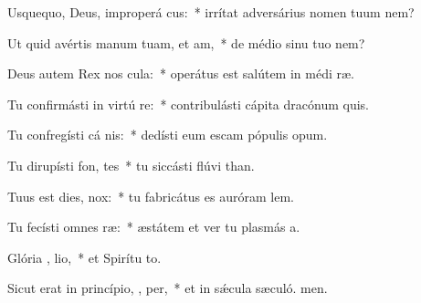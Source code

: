 \item Usquequo, Deus, improperá cus:~* irrítat adversárius nomen tuum  nem?
\item Ut quid avértis manum tuam, et  am,~* de médio sinu tuo  nem?
\item Deus autem Rex nos  cula:~* operátus est salútem in médi ræ.
\item Tu confirmásti in virtú  re:~* contribulásti cápita dracónum  quis.
\item Tu confregísti cá nis:~* dedísti eum escam pópulis opum.
\item Tu dirupísti fon,  tes~* tu siccásti flúvi than.
\item Tuus est dies,    nox:~* tu fabricátus es auróram  lem.
\item Tu fecísti omnes  ræ:~* æstátem et ver tu plasmás a.
\item Glória ,  lio,~* et Spirítu to.
\item Sicut erat in princípio,  ,  per,~* et in sǽcula sæculó. men.

